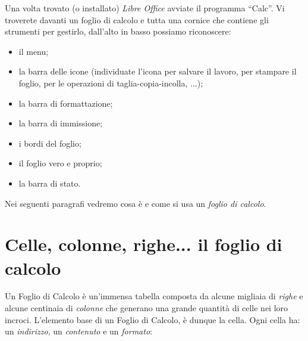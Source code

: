 
Una volta trovato (o installato) \emph{Libre Office} avviate il programma ``Calc''.
Vi troverete davanti un foglio di calcolo e tutta una cornice che contiene
gli strumenti per gestirlo, dall'alto in basso possiamo riconoscere:

\begin{itemize} [noitemsep]
\item il menu;
\item {}
la barra delle icone (individuate l'icona per salvare il lavoro,
per stampare il foglio, per le operazioni di taglia-copia-incolla, ...);
\item la barra di formattazione;
\item la barra di immissione;
\item i bordi del foglio;
\item il foglio vero e proprio;
\item la barra di stato.
\end{itemize}

Nei seguenti paragrafi vedremo cosa è e come si usa un \emph{foglio di calcolo}.

\section{Celle, colonne, righe... il foglio di calcolo}
\label{fogliodicalcolo:celle-colonne-righe-il-foglio-di-calcolo}


Un Foglio di Calcolo è un'immensa tabella composta da alcune migliaia di
\emph{righe} e alcune centinaia di \emph{colonne} che generano una grande 
quantità di celle nei loro incroci.
L'elemento base di un Foglio di Calcolo, è dunque la cella.
Ogni cella ha: un \emph{indirizzo}, un \emph{contenuto} e un \emph{formato}:

